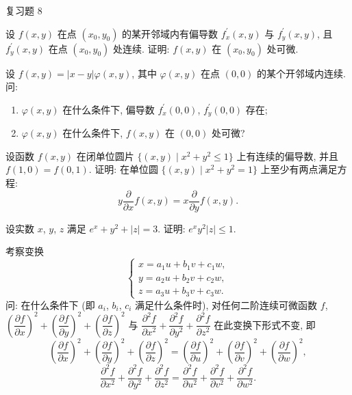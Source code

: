 \begin{exblock}{复习题 8}
\item 设 $f(x,y)$ 在点 $(x_{0}, y_{0})$ 的某开邻域内有偏导数 $f_{x}^{\prime}(x,y)$ 与 $f_{y}^{\prime}(x,y)$, 且 $f_{y}^{\prime}(x,y)$ 在点 $(x_{0}, y_{0})$ 处连续. 证明: $f(x,y)$ 在 $(x_{0}, y_{0})$ 处可微.

\item 设 $f(x,y) = |x-y|\varphi(x,y)$, 其中 $\varphi(x,y)$ 在点 $(0,0)$ 的某个开邻域内连续. 问:
\begin{enumerate}
  \item[(1)] $\varphi(x,y)$ 在什么条件下, 偏导数 $f_{x}^{\prime}(0,0)$, $f_{y}^{\prime}(0,0)$ 存在;
  \item[(2)] $\varphi(x,y)$ 在什么条件下, $f(x,y)$ 在 $(0,0)$ 处可微?
\end{enumerate}

\item 设函数 $f(x,y)$ 在闭单位圆片 $\bigl\{(x,y) \mid x^{2} + y^{2} \leqslant 1\bigr\}$ 上有连续的偏导数, 并且 $f(1,0) = f(0,1)$. 证明: 在单位圆 $\bigl\{(x,y) \mid x^{2} + y^{2} = 1\bigr\}$ 上至少有两点满足方程:
\[
  y\frac{\partial}{\partial x}f(x,y) = x\frac{\partial}{\partial y}f(x,y).
\]

\item 设实数 $x$, $y$, $z$ 满足 $e^{x} + y^{2} + |z| = 3$. 证明: $e^{x}y^{2}|z| \leqslant 1$.

\item 考察变换
\[
  \begin{cases}
    x = a_{1}u + b_{1}v + c_{1}w, \\
    y = a_{2}u + b_{2}v + c_{2}w, \\
    z = a_{3}u + b_{3}v + c_{3}w.
  \end{cases}
\]
问: 在什么条件下 (即 $a_{i}$, $b_{i}$, $c_{i}$ 满足什么条件时), 对任何二阶连续可微函数 $f$, $\left(\dfrac{\partial f}{\partial x}\right)^{2} + \left(\dfrac{\partial f}{\partial y}\right)^{2} + \left(\dfrac{\partial f}{\partial z}\right)^{2}$ 与 $\dfrac{\partial^{2}f}{\partial x^{2}} + \dfrac{\partial^{2}f}{\partial y^{2}} + \dfrac{\partial^{2}f}{\partial z^{2}}$ 在此变换下形式不变, 即
\[
  \left(\frac{\partial f}{\partial x}\right)^{2} + \left(\frac{\partial f}{\partial y}\right)^{2} + \left(\frac{\partial f}{\partial z}\right)^{2} = \left(\frac{\partial f}{\partial u}\right)^{2} + \left(\frac{\partial f}{\partial v}\right)^{2} + \left(\frac{\partial f}{\partial w}\right)^{2},
\]
\[
  \frac{\partial^{2}f}{\partial x^{2}} + \frac{\partial^{2}f}{\partial y^{2}} + \frac{\partial^{2}f}{\partial z^{2}} = \frac{\partial^{2}f}{\partial u^{2}} + \frac{\partial^{2}f}{\partial v^{2}} + \frac{\partial^{2}f}{\partial w^{2}}.
\]


\end{exblock}
